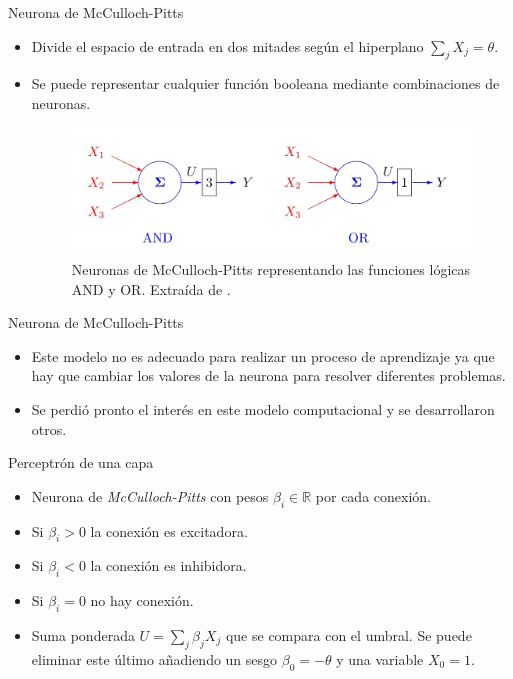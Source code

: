 \documentclass[spanish]{beamer}
\begin{document}
\begin{frame}{Neurona de McCulloch-Pitts}
  \begin{itemize}
    \item Divide el espacio de entrada en dos mitades según el hiperplano $\sum_j X_j = \theta$.
    \item Se puede representar cualquier función booleana mediante combinaciones de neuronas.

    \vspace{1em}

    \begin{figure}[h]
    \centering
    \includegraphics[width=.8\textwidth]{img/and-or}
    \caption{Neuronas de McCulloch-Pitts representando las funciones lógicas AND y OR. Extraída de \parencite{izenman_modern_2008}.}
    \label{fig:and-or}
  \end{figure}
  \end{itemize}
\end{frame}

\begin{frame}{Neurona de McCulloch-Pitts}
  \begin{itemize}
    \item Este modelo no es adecuado para realizar un proceso de aprendizaje ya que hay que cambiar los valores de la neurona para resolver diferentes problemas.
    \item Se perdió pronto el interés en este modelo computacional y se desarrollaron otros.
  \end{itemize}
\end{frame}

\begin{frame}{Perceptrón de una capa}
  \begin{itemize}
    \item Neurona de \textit{McCulloch-Pitts} con pesos $\beta_i \in \mathbb{R}$ por cada conexión.
    \item Si $\beta_i > 0$ la conexión es excitadora.
    \item Si $\beta_i < 0$ la conexión es inhibidora.
    \item Si  $\beta_i = 0$ no hay conexión.
    \item Suma ponderada $U = \sum_j \beta_j X_j$ que se compara con el umbral. Se puede eliminar este último añadiendo un sesgo $\beta_0 = - \theta$ y una variable $X_0 = 1$.
  \end{itemize}
\end{frame}
\end{document}
